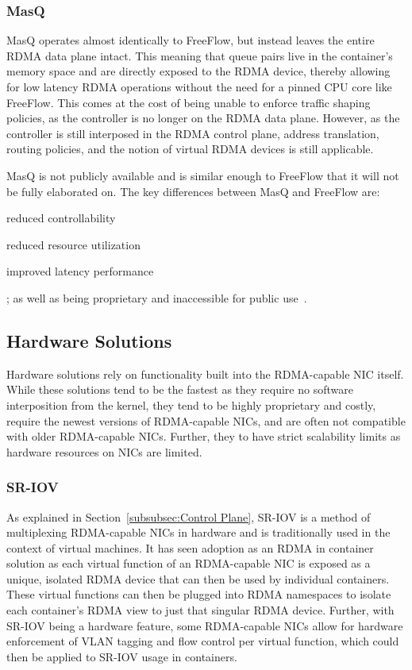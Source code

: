 \documentclass[12pt,titlepage]{article}
\begin{document}
\subsubsection{MasQ}
MasQ operates almost identically to FreeFlow, but instead leaves the entire RDMA data plane intact.
This meaning that queue pairs live in the container's memory space and are directly exposed to the RDMA device, thereby allowing for low latency RDMA operations without the need for a pinned CPU core like FreeFlow.
This comes at the cost of being unable to enforce traffic shaping policies, as the controller is no longer on the RDMA data plane.
However, as the controller is still interposed in the RDMA control plane, address translation, routing policies, and the notion of virtual RDMA devices is still applicable.

MasQ is not publicly available and is similar enough to FreeFlow that it will not be fully elaborated on.
The key differences between MasQ and FreeFlow are:
\begin{enumerate*}[label={(\arabic*)},itemjoin*={{, and }},itemjoin={{, }}]
	\item reduced controllability
	\item reduced resource utilization
	\item improved latency performance
\end{enumerate*};
as well as being proprietary and inaccessible for public use~\cite{he2020masq}.

\subsection{Hardware Solutions}
Hardware solutions rely on functionality built into the RDMA-capable NIC itself.
While these solutions tend to be the fastest as they require no software interposition from the kernel, they tend to be highly proprietary and costly, require the newest versions of RDMA-capable NICs, and are often not compatible with older RDMA-capable NICs.
Further, they to have strict scalability limits as hardware resources on NICs are limited.

\subsubsection{SR-IOV}
As explained in Section~\ref{subsubsec:Control Plane}, SR-IOV is a method of multiplexing RDMA-capable NICs in hardware and is traditionally used in the context of virtual machines.
It has seen adoption as an RDMA in container solution as each virtual function of an RDMA-capable NIC is exposed as a unique, isolated RDMA device that can then be used by individual containers.
These virtual functions can then be plugged into RDMA namespaces to isolate each container's RDMA view to just that singular RDMA device.
Further, with SR-IOV being a hardware feature, some RDMA-capable NICs allow for hardware enforcement of VLAN tagging and flow control per virtual function, which could then be applied to SR-IOV usage in containers.
\end{document}
